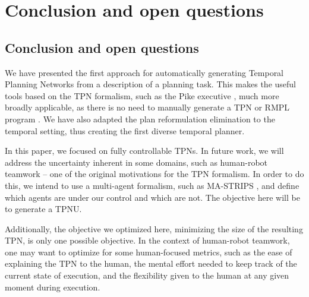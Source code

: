\chapter{Conclusion and open questions}
\label{chap:conclusion}

\section{Conclusion and open questions}
We have presented the first approach for automatically generating Temporal Planning Networks from a description of a planning task. This makes the useful tools based on the TPN formalism, such as the Pike executive \cite{levine2018watching}, much more broadly applicable, as there is no need to manually generate a TPN or RMPL program \cite{kim2001executing}. We have also 
adapted the plan reformulation elimination \cite{katz2018novel} to the temporal setting, thus creating the first diverse temporal planner.

In this paper, we focused on fully controllable TPNs. In future work, we will address the uncertainty inherent in some domains, such as human-robot teamwork -- one of the original motivations for the TPN formalism. In order to do this, we intend to use a multi-agent formalism, such as {\sc MA-STRIPS} \cite{DBLP:conf/aips/BrafmanD08}, and define which agents are under our control and which are not. The objective here will be to generate a TPNU.




Additionally, the objective we optimized here, minimizing the size of the resulting TPN, is only one possible objective. In the context of human-robot teamwork, one may want to optimize for some human-focused metrics, such as 
the ease of explaining the TPN to the human, the mental effort needed to keep track of the current state of execution, and the flexibility given to the human at any given moment during execution.

